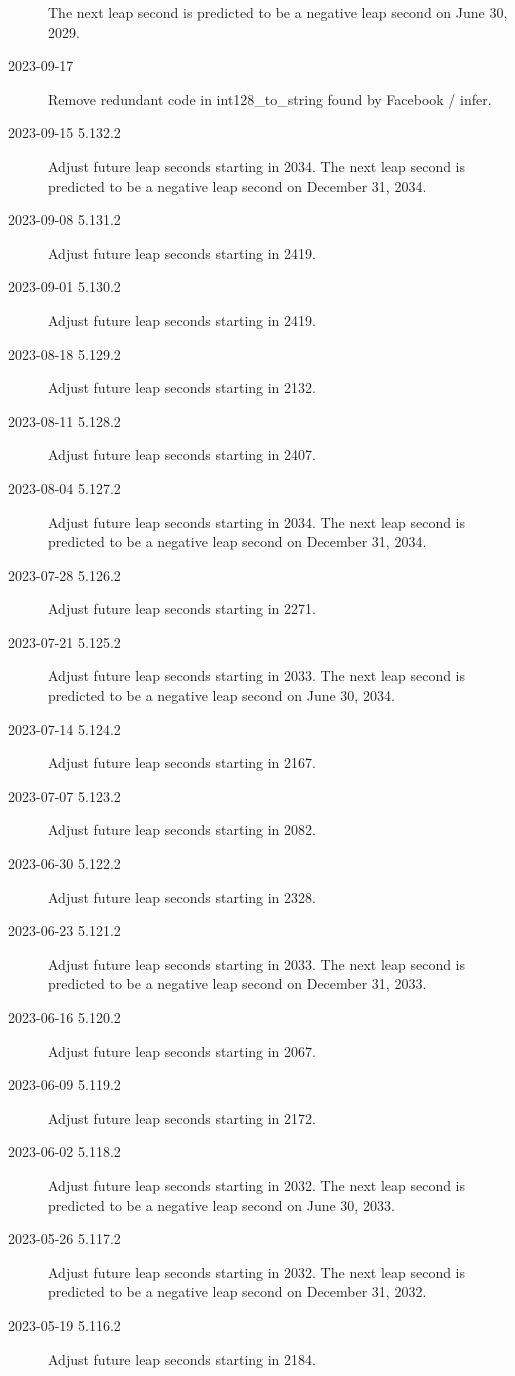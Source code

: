 \documentclass[letterpaper,twoside]{article}
\begin{document}
\begin{description}
  The next leap second is predicted to be a negative leap second
  on June 30, 2029.
\item[2023-09-17]Remove redundant code in int128\_to\_string
  found by Facebook / infer.
\item[2023-09-15 5.132.2]Adjust future leap seconds starting in 2034.
  The next leap second is predicted to be a negative leap second
  on December 31, 2034.
\item[2023-09-08 5.131.2]Adjust future leap seconds starting in 2419.
\item[2023-09-01 5.130.2]Adjust future leap seconds starting in 2419.
\item[2023-08-18 5.129.2]Adjust future leap seconds starting in 2132.
\item[2023-08-11 5.128.2]Adjust future leap seconds starting in 2407.
\item[2023-08-04 5.127.2]Adjust future leap seconds starting in 2034.
  The next leap second is predicted to be a negative leap second
  on December 31, 2034.
\item[2023-07-28 5.126.2]Adjust future leap seconds starting in 2271.
\item[2023-07-21 5.125.2]Adjust future leap seconds starting in 2033.
  The next leap second is predicted to be a negative leap second
  on June 30, 2034.
\item[2023-07-14 5.124.2]Adjust future leap seconds starting in 2167.
\item[2023-07-07 5.123.2]Adjust future leap seconds starting in 2082.
\item[2023-06-30 5.122.2]Adjust future leap seconds starting in 2328.
\item[2023-06-23 5.121.2]Adjust future leap seconds starting in 2033.
  The next leap second is predicted to be a negative leap second
  on December 31, 2033.
\item[2023-06-16 5.120.2]Adjust future leap seconds starting in 2067.
\item[2023-06-09 5.119.2]Adjust future leap seconds starting in 2172.
\item[2023-06-02 5.118.2]Adjust future leap seconds starting in 2032.
  The next leap second is predicted to be a negative leap second
  on June 30, 2033.
\item[2023-05-26 5.117.2]Adjust future leap seconds starting in 2032.
  The next leap second is predicted to be a negative leap second
  on December 31, 2032.
\item[2023-05-19 5.116.2]Adjust future leap seconds starting in 2184.

\end{description}
\end{document}
